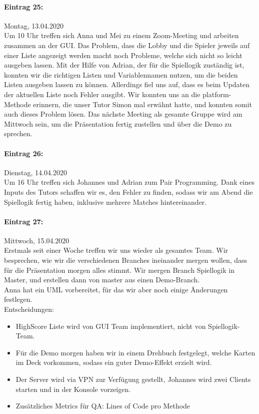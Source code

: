 \documentclass[12pt]{article}
\begin{document}
\paragraph{Eintrag 25:}
Montag, 13.04.2020\\
Um 10 Uhr treffen sich Anna und Mei zu einem Zoom-Meeting und arbeiten zusammen an der GUI. Das Problem, dass die Lobby und die Spieler jeweils auf einer Liste angezeigt werden macht noch Probleme, welche sich nicht so leicht ausgeben lassen. Mit der Hilfe von Adrian, der f\"ur die Spiellogik zust\"andig ist, konnten wir die richtigen Listen und Variablennamen nutzen, um die beiden Listen ausgeben lassen zu k\"onnen. Allerdings fiel uns auf, dass es beim Updaten der aktuellen Liste noch Fehler ausgibt. Wir konnten uns an die platform-Methode erinnern, die unser Tutor Simon mal erw\"ahnt hatte, und konnten somit auch dieses Problem l\"osen. Das n\"achste Meeting als gesamte Gruppe wird am Mittwoch sein, um die Pr\"asentation fertig zustellen und \"uber die Demo zu sprechen.

\paragraph{Eintrag 26:}
Dienstag, 14.04.2020\\
Um 16 Uhr treffen sich Johannes und Adrian zum Pair Programming. Dank eines Inputs des Tutors schaffen wir es, den Fehler zu finden, sodass wir am Abend die Spiellogik fertig haben, inklusive mehrere Matches hintereinander.

\paragraph{Eintrag 27:}
Mittwoch, 15.04.2020\\
Erstmals seit einer Woche treffen wir uns wieder als gesamtes Team. Wir besprechen, wie wir die verschiedenen Branches ineinander mergen wollen, dass f\"ur die Pr\"asentation morgen alles stimmt. Wir mergen Branch Spiellogik in Master, und erstellen dann von master aus einen Demo-Branch.\\ Anna hat ein UML vorbereitet, f\"ur das wir aber noch einige \"Anderungen festlegen.\\
Entscheidungen:
\begin{itemize}
\item HighScore Liste wird von GUI Team implementiert, nicht von Spiellogik-Team.
\item F\"ur die Demo morgen haben wir in einem Drehbuch festgelegt, welche Karten im Deck vorkommen, sodass ein guter Demo-Effekt erzielt wird. 
\item Der Server wird via VPN zur Verf\"ugung gestellt, Johannes wird zwei Clients starten und in der Konsole vorzeigen.
\item Zus\"atzliches Metrics f\"ur QA: Lines of Code pro Methode
\end{itemize}
\end{document}
